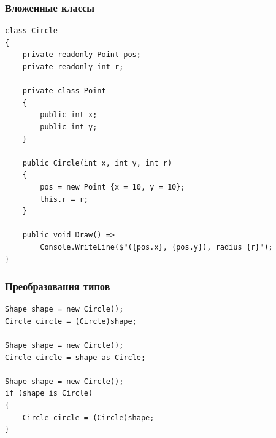 \documentclass[xetex,mathserif,serif]{beamer}
\begin{document}
	\begin{frame}[fragile]
		\frametitle{Вложенные классы}
		\begin{footnotesize}
			\begin{verbatim}
class Circle
{
    private readonly Point pos;
    private readonly int r;

    private class Point
    {
        public int x;
        public int y;
    }

    public Circle(int x, int y, int r)
    {
        pos = new Point {x = 10, y = 10};
        this.r = r;
    }

    public void Draw() =>
        Console.WriteLine($"({pos.x}, {pos.y}), radius {r}");
}
			\end{verbatim}
		\end{footnotesize}
\end{frame}

	\begin{frame}[fragile]
		\frametitle{Преобразования типов}
		\begin{verbatim}
Shape shape = new Circle();
Circle circle = (Circle)shape;

Shape shape = new Circle();
Circle circle = shape as Circle;

Shape shape = new Circle();
if (shape is Circle)
{
    Circle circle = (Circle)shape;
}
		\end{verbatim}
\end{frame}
\end{document}

